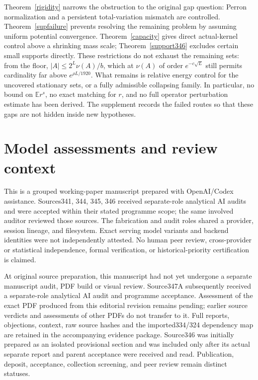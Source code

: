 \documentclass[11pt]{article}
\newcommand{\E}{\mathbb E}
\begin{document}
Theorem~\ref{rigidity} narrows the obstruction to the original gap question: Perron normalization and a persistent total-variation mismatch are controlled. Theorem~\ref{supfailure} prevents resolving the remaining problem by assuming uniform potential convergence. Theorem~\ref{capacity} gives direct actual-kernel control above a shrinking mass scale; Theorem~\ref{support346} excludes certain small supports directly. These restrictions do not exhaust the remaining sets: from the floor, $|A|\leq2^L\nu(A)/b$, which at $\nu(A)$ of order $e^{-c\sqrt L}$ still permits cardinality far above $e^{\rho L/1920}$. What remains is relative energy control for the uncovered stationary sets, or a fully admissible collapsing family. In particular, no bound on $\E r^s$, no exact matching for $r$, and no full operator perturbation estimate has been derived. The supplement records the failed routes so that these gaps are not hidden inside new hypotheses.

\section{Model assessments and review context}
This is a grouped working-paper manuscript prepared with OpenAI/Codex assistance. Sources341, 344, 345, 346 received separate-role analytical AI audits and were accepted within their stated programme scope; the same involved auditor reviewed those sources. The fabrication and audit roles shared a provider, session lineage, and filesystem. Exact serving model variants and backend identities were not independently attested. No human peer review, cross-provider or statistical independence, formal verification, or historical-priority certification is claimed.

At original source preparation, this manuscript had not yet undergone a separate manuscript audit, PDF build or visual review. Source347A subsequently received a separate-role analytical AI audit and programme acceptance. Assessment of the exact PDF produced from this editorial revision remains pending; earlier source verdicts and assessments of other PDFs do not transfer to it. Full reports, objections, context, raw source hashes and the imported334/324 dependency map are retained in the accompanying evidence package. Source346 was initially prepared as an isolated provisional section and was included only after its actual separate report and parent acceptance were received and read. Publication, deposit, acceptance, collection screening, and peer review remain distinct statuses.
\end{document}
